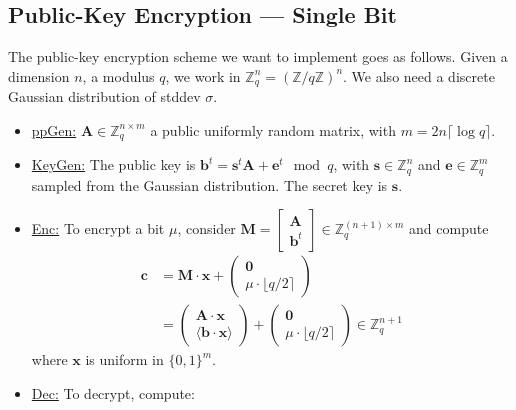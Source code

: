 \documentclass[10pt,a4paper,nobib]{tufte-handout}
\begin{document}
\subsection{Public-Key Encryption --- Single Bit}

The public-key encryption scheme we want to implement goes as follows. Given a dimension $n$, a modulus $q$, we work in $\mathbb{Z}^n_q = (\mathbb{Z}/q\mathbb{Z})^n$. We also need a discrete Gaussian distribution of stddev $\sigma$.

\begin{itemize}
  \item \underline{ppGen:} $\mathbf{A} \in \mathbb{Z}^{n\times m}_q$ a public uniformly random matrix, with $m = 2 n \lceil\log q\rceil$.
  \item \underline{KeyGen:} The public key is $\mathbf{b}^t = \mathbf{s}^t\mathbf{A} + \mathbf{e}^t \mod q$, with $\mathbf{s} \in \mathbb{Z}^n_q$ and $\mathbf{e} \in \mathbb{Z}^m_q$ sampled from the Gaussian distribution. The secret key is $\mathbf{s}$.
  \item \underline{Enc:} To encrypt a bit $\mu$, consider $\mathbf{M} = \left[ \begin{smallmatrix}
    \mathbf{A} \\
    \mathbf{b}^t
  \end{smallmatrix}\right] \in \mathbb{Z}^{(n+1)\times m}_q$ and compute
  \begin{align*}
    \mathbf{c} &= \mathbf{M}\cdot\mathbf{x} + \left(
               \begin{smallmatrix}
                 \mathbf{0} \\
                 \mu \cdot \lfloor q/2 \rceil
               \end{smallmatrix} \right)\\
               &= \left(\begin{smallmatrix}
                 \mathbf{A}\cdot \mathbf{x} \\
                 \langle \mathbf{b}\cdot \mathbf{x}\rangle
               \end{smallmatrix} \right) +
               \left( 
               \begin{smallmatrix}
                 \mathbf{0} \\
                 \mu \cdot \lfloor q/2 \rceil
               \end{smallmatrix} \right) \in \mathbb{Z}^{n+1}_q
  \end{align*}
  where $\mathbf{x}$ is uniform in $\{0, 1\}^m$.
  \item \underline{Dec:}  To decrypt, compute: 

\end{itemize}
\end{document}
